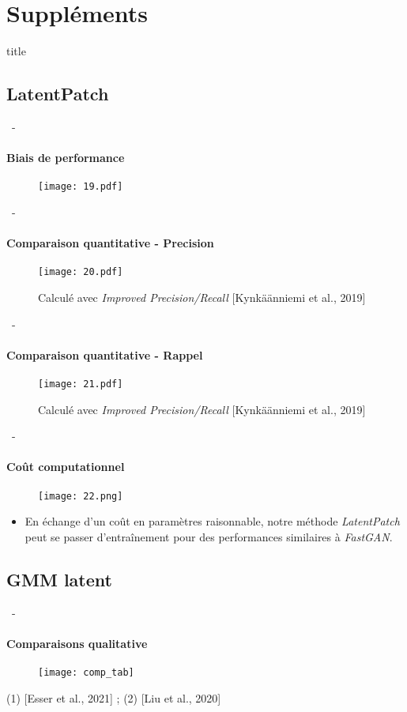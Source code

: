 \documentclass[aspectratio=169, 22pt]{beamer}
\begin{document}
\makethanks

\section{Suppléments}
\begin{frame}
  \begin{beamercolorbox}[sep=15pt,center,shadow=true,rounded=true]{title}
    \LARGE\bfseries \secname
  \end{beamercolorbox}
\end{frame}


\subsection{LatentPatch}
\begin{frame}{\secname~- \subsecname}
  \framesubtitle{Biais de performance}
  \begin{figure}
    \centering
    \texttt{[image: 19.pdf]}
  \end{figure}
\end{frame}

\begin{frame}{\secname~- \subsecname}
  \framesubtitle{Comparaison quantitative - Precision}
  \begin{figure}
    \texttt{[image: 20.pdf]}
    \caption{\small Calculé avec \emph{Improved Precision/Recall} [Kynkäänniemi et al., 2019]}
  \end{figure}
\end{frame}

\begin{frame}{\secname~- \subsecname}
  \framesubtitle{Comparaison quantitative - Rappel}
  \begin{figure}
    \texttt{[image: 21.pdf]}
    \caption{\small Calculé avec \emph{Improved Precision/Recall} [Kynkäänniemi et al., 2019]}
  \end{figure}
\end{frame}
 
\begin{frame}{\secname~- \subsecname}
  \framesubtitle{Coût computationnel}
  \begin{figure}
    \texttt{[image: 22.png]}
  \end{figure}
  \begin{itemize}
  \item En échange d'un coût en paramètres raisonnable, notre méthode
    \emph{LatentPatch} peut se passer d'entraînement pour des performances
    similaires à \emph{FastGAN}.
  \end{itemize}
\end{frame}

\subsection{GMM latent}
\begin{frame}{\secname~- \subsecname}
  \framesubtitle{Comparaisons qualitative}
  \begin{figure}
    \texttt{[image: comp\_tab]}
  \end{figure}
  \scriptsize (1) [Esser et al., 2021] ; (2) [Liu et al., 2020]
\end{frame}
\end{document}
